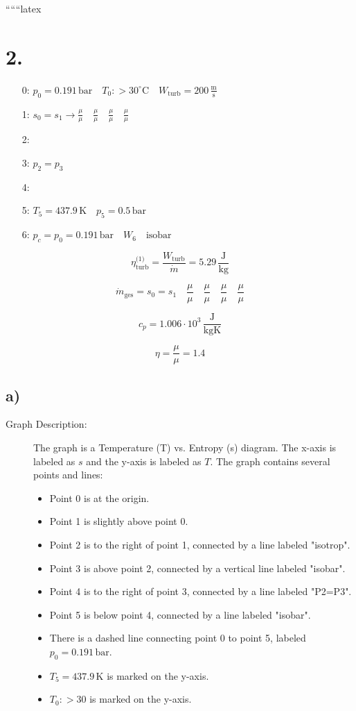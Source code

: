 
``````latex


\section*{2.}

\begin{itemize}
    \item[0:] $p_0 = 0.191 \, \text{bar} \quad T_0: > 30^\circ \text{C} \quad W_{\text{turb}} = 200 \, \frac{\text{m}}{\text{s}}$
    \item[1:] $s_0 = s_1 \rightarrow \frac{\mu}{\mu} \quad \frac{\mu}{\mu} \quad \frac{\mu}{\mu} \quad \frac{\mu}{\mu}$
    \item[2:]
    \item[3:] $p_2 = p_3$
    \item[4:]
    \item[5:] $T_5 = 437.9 \, \text{K} \quad p_5 = 0.5 \, \text{bar}$
    \item[6:] $p_c = p_0 = 0.191 \, \text{bar} \quad W_6 \quad \text{isobar}$
\end{itemize}

\[
\eta_{\text{turb}}^{\text{(1)}} = \frac{W_{\text{turb}}}{\dot{m}} = 5.29 \, \frac{\text{J}}{\text{kg}}
\]

\[
\dot{m}_{\text{ges}} = s_0 = s_1 \quad \frac{\mu}{\mu} \quad \frac{\mu}{\mu} \quad \frac{\mu}{\mu} \quad \frac{\mu}{\mu}
\]

\[
c_p = 1.006 \cdot 10^3 \, \frac{\text{J}}{\text{kgK}}
\]

\[
\eta = \frac{\mu}{\mu} = 1.4
\]

\subsection*{a)}

\begin{description}
    \item[Graph Description:] The graph is a Temperature (T) vs. Entropy (s) diagram. The x-axis is labeled as $s$ and the y-axis is labeled as $T$. The graph contains several points and lines:
    \begin{itemize}
        \item Point 0 is at the origin.
        \item Point 1 is slightly above point 0.
        \item Point 2 is to the right of point 1, connected by a line labeled "isotrop".
        \item Point 3 is above point 2, connected by a vertical line labeled "isobar".
        \item Point 4 is to the right of point 3, connected by a line labeled "P2=P3".
        \item Point 5 is below point 4, connected by a line labeled "isobar".
        \item There is a dashed line connecting point 0 to point 5, labeled $p_0 = 0.191 \, \text{bar}$.
        \item $T_5 = 437.9 \, \text{K}$ is marked on the y-axis.
        \item $T_0: > 30$ is marked on the y-axis.
    \end{itemize}
\end{description}

